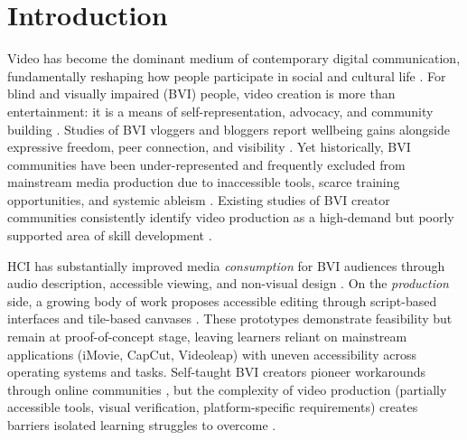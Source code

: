 \section{Introduction}
Video has become the dominant medium of contemporary digital communication, fundamentally reshaping how people participate in social and cultural life \cite{ha_global_2022}. For blind and visually impaired (BVI) people, video creation is more than entertainment: it is a means of self-representation, advocacy, and community building \cite{emara_its_2025,lyu_because_2024,niu_please_2024}. Studies of BVI vloggers and bloggers report wellbeing gains alongside expressive freedom, peer connection, and visibility \cite{seo_understanding_2021,zhang_understanding_2023}. Yet historically, BVI communities have been under-represented and frequently excluded from mainstream media production due to inaccessible tools, scarce training opportunities, and systemic ableism \cite{lyu_because_2024,raymond_examination_2024,lyu_i_2024-1}. Existing studies of BVI creator communities consistently identify video production as a high-demand but poorly supported area of skill development \cite{zhang_understanding_2023,seo_understanding_2021,lyu_i_2024-1}.

HCI has substantially improved media \textit{consumption} for BVI audiences through audio description, accessible viewing, and non-visual design \cite{aydin_towards_2020,natalie_audio_2024,wang_toward_2021}. On the \textit{production} side, a growing body of work proposes accessible editing through script-based interfaces \cite{huh_avscript_2023} and tile-based canvases \cite{lee_altcanvas_2024}. These prototypes demonstrate feasibility but remain at proof-of-concept stage, leaving learners reliant on mainstream applications (iMovie, CapCut, Videoleap) with uneven accessibility across operating systems and tasks. Self-taught BVI creators pioneer workarounds through online communities \cite{lyu_i_2024-1,seo_understanding_2021}, but the complexity of video production (partially accessible tools, visual verification, platform-specific requirements) creates barriers isolated learning struggles to overcome \cite{xiao_understanding_2025,zhang_understanding_2023}.


